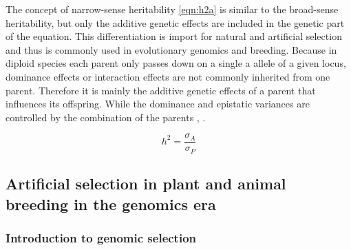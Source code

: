 The concept of narrow-sense heritability \ref{eqn:h2a} is similar to the broad-sense heritability, but only
the additive genetic effects are included in the genetic part of the equation. This differentiation is import
for natural and artificial selection and thus is commonly used in evolutionary genomics and breeding. Because
in diploid species each parent only passes down on a single a allele of a given locus, dominance effects or
interaction effects are not commonly inherited from one parent. Therefore it is mainly the additive
genetic effects of a parent that influences its offspring. While the dominance and epistatic variances are
controlled by the combination of the parents \cite{falconer1996}, \cite{walsh2018}.

\begin{equation}
 h^2 = \frac{\sigma_{A}}{\sigma_{P}}
 \label{eqn:h2a}
\end{equation}



\subsection{Artificial selection in plant and animal breeding in the genomics era}
\subsubsection{Introduction to genomic selection }

